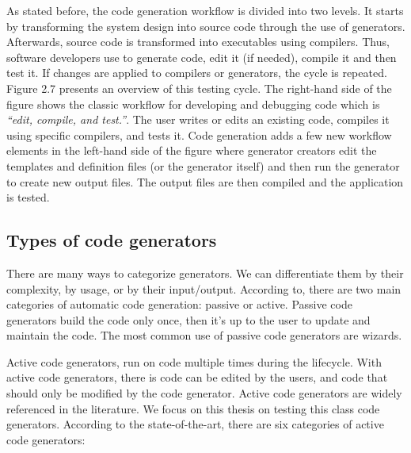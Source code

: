 As stated before, the code generation workflow is divided into two levels. It starts by transforming the system design into source code through the use of generators. Afterwards, source code is transformed into executables using compilers. Thus, software developers use to generate code, edit it (if needed), compile it and then test it. If changes are applied to compilers or generators, the cycle is repeated. Figure 2.7 presents an overview of this testing cycle. The right-hand side of the figure shows the classic workflow for developing and debugging code which is \textit{“edit, compile, and test.”}. The user writes or edits an existing code, compiles it using specific compilers, and tests it. Code generation adds a few new workflow elements in the left-hand side of the figure where generator creators edit the templates and definition files (or the generator itself) and then run the generator to create new output files. The output files are then compiled and the application is tested. 



\subsection{Types of code generators}
There are many ways to categorize generators. We can differentiate them by their complexity, by usage, or by their input/output. According to\cite{herrington2003code}, there are two main categories of automatic code generation: passive or active. Passive code generators build the code only once, then it’s up to the user to update and maintain the code. 
The most common use of passive code generators are wizards. 

Active code generators, run on code multiple times during the lifecycle. With active code generators, there is code can be edited by the users, and code that should only be modified by the code generator. Active code generators are widely referenced in the literature\cite{pais2005tool,amanquah2009rapid}. We focus on this thesis on testing this class code generators.
According to the state-of-the-art\cite{herrington2003code,hunt2000pragmatic,fertalj2008source,bajovs2013code}, there are six categories of active code generators: 

